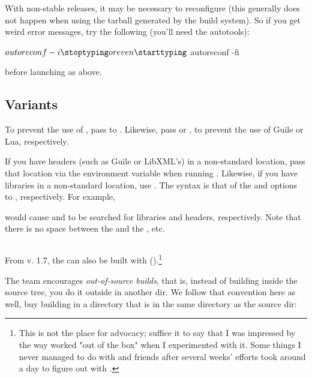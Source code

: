 With non-stable releases, it may be necessary to reconfigure (this generally
does not happen when using the tarball generated by the build system). So if you
get weird error messages, try the following (you'll need the \gnu{} autotools):

\starttyping
$ autoreconf -i
\stoptyping

or even

\starttyping
$ autoreconf -fi
\stoptyping

before launching  as above.

\subsection{Variants}

To prevent the use of \libxml, pass  to
. Likewise,  pass
 or , to prevent the use of Guile or
Lua, respectively. 

If you have headers (such as Guile or LibXML's) in a non-standard location, pass
that location via the  environment variable when running
. Likewise, if you have libraries in a non-standard
location, use . The syntax is that of the  and
 options to , respectively. For example,


would cause  and  to be searched for
libraries and headers, respectively. Note that there is no space between the
 and the , etc.

\subsection{\cmake{}}

From v. 1.7, the \nutils{} can also be built with \cmake{}
().\footnote{This is not the place for advocacy; suffice it
to say that I was impressed by the way \cmake{} worked "out of the box" when I
experimented with it. Some things I never managed to do with
 and friends after several weeks' efforts took around a day
to figure out with \cmake{}.} 

The \cmake{} team encourages {\em out-of-source builds}, that is, instead of
building inside the source tree, you do it outside in another dir. We follow
that convention here as well, buy building in a directory that is in the same
directory as the \nutils{} source dir:

